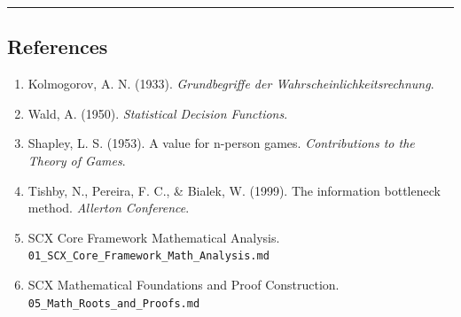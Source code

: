 \documentclass[
  12pt,
]{ctexart}
\providecommand{\tightlist}{%
  \setlength{\itemsep}{0pt}\setlength{\parskip}{0pt}}
\begin{document}
\begin{center}\rule{0.5\linewidth}{0.5pt}\end{center}

\subsection{References}\label{references}

\begin{enumerate}
\def\labelenumi{\arabic{enumi}.}
\tightlist
\item
  Kolmogorov, A. N. (1933). \emph{Grundbegriffe der Wahrscheinlichkeitsrechnung}.
\item
  Wald, A. (1950). \emph{Statistical Decision Functions}.
\item
  Shapley, L. S. (1953). A value for n-person games. \emph{Contributions to the Theory of Games}.
\item
  Tishby, N., Pereira, F. C., \& Bialek, W. (1999). The information bottleneck method. \emph{Allerton Conference}.
\item
  SCX Core Framework Mathematical Analysis. \texttt{01\_SCX\_Core\_Framework\_Math\_Analysis.md}
\item
  SCX Mathematical Foundations and Proof Construction. \texttt{05\_Math\_Roots\_and\_Proofs.md}
\end{enumerate}
\end{document}

